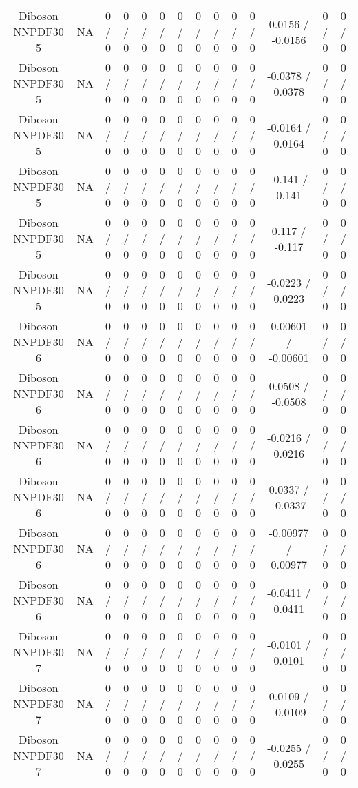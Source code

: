 \documentclass[10pt]{article}
\begin{document}
\begin{table}[htbp]
\begin{center}
\begin{tabular}{|c|c|c|c|c|c|c|c|c|c|c|c|c|c|}
  Diboson NNPDF30 5 &    NA    & 0 / 0 & 0 / 0 & 0 / 0 & 0 / 0 & 0 / 0 & 0 / 0 & 0 / 0 & 0 / 0 & 0 / 0 & 0.0156 / -0.0156 & 0 / 0 & 0 / 0 \\ 
  Diboson NNPDF30 5 &    NA    & 0 / 0 & 0 / 0 & 0 / 0 & 0 / 0 & 0 / 0 & 0 / 0 & 0 / 0 & 0 / 0 & 0 / 0 & -0.0378 / 0.0378 & 0 / 0 & 0 / 0 \\ 
  Diboson NNPDF30 5 &    NA    & 0 / 0 & 0 / 0 & 0 / 0 & 0 / 0 & 0 / 0 & 0 / 0 & 0 / 0 & 0 / 0 & 0 / 0 & -0.0164 / 0.0164 & 0 / 0 & 0 / 0 \\ 
  Diboson NNPDF30 5 &    NA    & 0 / 0 & 0 / 0 & 0 / 0 & 0 / 0 & 0 / 0 & 0 / 0 & 0 / 0 & 0 / 0 & 0 / 0 & -0.141 / 0.141 & 0 / 0 & 0 / 0 \\ 
  Diboson NNPDF30 5 &    NA    & 0 / 0 & 0 / 0 & 0 / 0 & 0 / 0 & 0 / 0 & 0 / 0 & 0 / 0 & 0 / 0 & 0 / 0 & 0.117 / -0.117 & 0 / 0 & 0 / 0 \\ 
  Diboson NNPDF30 5 &    NA    & 0 / 0 & 0 / 0 & 0 / 0 & 0 / 0 & 0 / 0 & 0 / 0 & 0 / 0 & 0 / 0 & 0 / 0 & -0.0223 / 0.0223 & 0 / 0 & 0 / 0 \\ 
  Diboson NNPDF30 6 &    NA    & 0 / 0 & 0 / 0 & 0 / 0 & 0 / 0 & 0 / 0 & 0 / 0 & 0 / 0 & 0 / 0 & 0 / 0 & 0.00601 / -0.00601 & 0 / 0 & 0 / 0 \\ 
  Diboson NNPDF30 6 &    NA    & 0 / 0 & 0 / 0 & 0 / 0 & 0 / 0 & 0 / 0 & 0 / 0 & 0 / 0 & 0 / 0 & 0 / 0 & 0.0508 / -0.0508 & 0 / 0 & 0 / 0 \\ 
  Diboson NNPDF30 6 &    NA    & 0 / 0 & 0 / 0 & 0 / 0 & 0 / 0 & 0 / 0 & 0 / 0 & 0 / 0 & 0 / 0 & 0 / 0 & -0.0216 / 0.0216 & 0 / 0 & 0 / 0 \\ 
  Diboson NNPDF30 6 &    NA    & 0 / 0 & 0 / 0 & 0 / 0 & 0 / 0 & 0 / 0 & 0 / 0 & 0 / 0 & 0 / 0 & 0 / 0 & 0.0337 / -0.0337 & 0 / 0 & 0 / 0 \\ 
  Diboson NNPDF30 6 &    NA    & 0 / 0 & 0 / 0 & 0 / 0 & 0 / 0 & 0 / 0 & 0 / 0 & 0 / 0 & 0 / 0 & 0 / 0 & -0.00977 / 0.00977 & 0 / 0 & 0 / 0 \\ 
  Diboson NNPDF30 6 &    NA    & 0 / 0 & 0 / 0 & 0 / 0 & 0 / 0 & 0 / 0 & 0 / 0 & 0 / 0 & 0 / 0 & 0 / 0 & -0.0411 / 0.0411 & 0 / 0 & 0 / 0 \\ 
  Diboson NNPDF30 7 &    NA    & 0 / 0 & 0 / 0 & 0 / 0 & 0 / 0 & 0 / 0 & 0 / 0 & 0 / 0 & 0 / 0 & 0 / 0 & -0.0101 / 0.0101 & 0 / 0 & 0 / 0 \\ 
  Diboson NNPDF30 7 &    NA    & 0 / 0 & 0 / 0 & 0 / 0 & 0 / 0 & 0 / 0 & 0 / 0 & 0 / 0 & 0 / 0 & 0 / 0 & 0.0109 / -0.0109 & 0 / 0 & 0 / 0 \\ 
  Diboson NNPDF30 7 &    NA    & 0 / 0 & 0 / 0 & 0 / 0 & 0 / 0 & 0 / 0 & 0 / 0 & 0 / 0 & 0 / 0 & 0 / 0 & -0.0255 / 0.0255 & 0 / 0 & 0 / 0 \\ 

\end{tabular}
\end{center}
\end{table}
\end{document}
